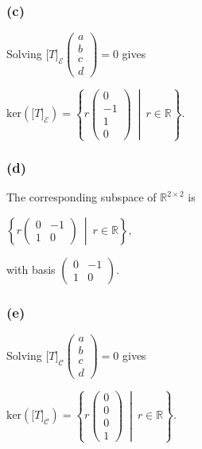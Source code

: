 \subsubsection{(c)}

Solving \(\lbrack T\rbrack_{\mathcal{E}}\begin{pmatrix}
a \\
b \\
c \\
d
\end{pmatrix} = 0\) gives

\(\text{ker}\left( \lbrack T\rbrack_{\mathcal{E}} \right) = \left\{ r\begin{pmatrix}
0 \\
{- 1} \\
1 \\
0
\end{pmatrix}\  \middle| \ r \in \mathbb{R} \right\}.\)

\subsubsection{(d)}

The corresponding subspace of \(\mathbb{R}^{2 \times 2}\) is

\(\left\{ r\begin{pmatrix}
0 & {- 1} \\
1 & 0
\end{pmatrix}\  \middle| \ r \in \mathbb{R} \right\},\)

with basis \(\begin{pmatrix}
0 & {- 1} \\
1 & 0
\end{pmatrix}\).

\subsubsection{(e)}

Solving \(\lbrack T\rbrack_{\mathcal{C}}\begin{pmatrix}
a \\
b \\
c \\
d
\end{pmatrix} = 0\) gives

\(\text{ker}\left( \lbrack T\rbrack_{\mathcal{C}} \right) = \left\{ r\begin{pmatrix}
0 \\
0 \\
0 \\
1
\end{pmatrix}\  \middle| \ r \in \mathbb{R} \right\}.\)

